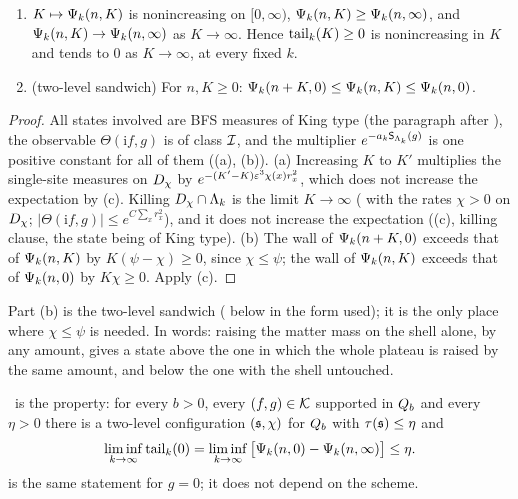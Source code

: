 \begin{lemma}\label{rot:lem:tailprop}
\begin{enumerate}[label=\textup{(\alph*)},leftmargin=*]
\item $K\mapsto\Psi_k(n,K)$ is nonincreasing on $[0,\infty)$, $\Psi_k(n,K)\ge\Psi_k(n,\infty)$, and $\Psi_k(n,K)\to\Psi_k(n,\infty)$ as $K\to\infty$. Hence $\operatorname{tail}_k(K)\ge0$ is nonincreasing in $K$ and tends to $0$ as $K\to\infty$, at every fixed $k$.
\item (two-level sandwich) For $n,K\ge0$: $\Psi_k(n+K,0)\le\Psi_k(n,K)\le\Psi_k(n,0)$.
\end{enumerate}
\end{lemma}

\begin{proof}
All states involved are BFS measures of King type (the paragraph after ), the observable $\Theta(\mathrm if,g)$ is of class $\mathcal I$, and the multiplier $e^{-a_k\mathsf S_{\Lambda_k}(g)}$ is one positive constant for all of them ((a), (b)). (a) Increasing $K$ to $K'$ multiplies the single-site measures on $D_\chi$ by $e^{-(K'-K)\varepsilon^3\chi(x)r_x^2}$, which does not increase the expectation by (c). Killing $D_\chi\cap\Lambda_k$ is the limit $K\to\infty$ ( with the rates $\chi>0$ on $D_\chi$; $|\Theta(\mathrm if,g)|\le e^{C\sum_xr_x^2}$), and it does not increase the expectation ((c), killing clause, the state being of King type). (b) The wall of $\Psi_k(n+K,0)$ exceeds that of $\Psi_k(n,K)$ by $K(\psi-\chi)\ge0$, since $\chi\le\psi$; the wall of $\Psi_k(n,K)$ exceeds that of $\Psi_k(n,0)$ by $K\chi\ge0$. Apply (c).
\end{proof}

Part (b) is the two-level sandwich ( below in the form used); it is the only place where $\chi\le\psi$ is needed. In words: raising the matter mass on the shell alone, by any amount, gives a state above the one in which the whole plateau is raised by the same amount, and below the one with the shell untouched.

\begin{definition}\label{rot:hyp:SH}
\textbf{\SHa}\ is the property: for every $b>0$, every $(f,g)\in\mathcal K$ supported in $Q_{b}$ and every $\eta>0$ there is a two-level configuration $(\mathfrak s,\chi)$ for $Q_{b}$ with $\tau(\mathfrak s)\le\eta$ and
\[
\liminf_{k\to\infty}\operatorname{tail}_k(0)=\liminf_{k\to\infty}\big[\Psi_k(n,0)-\Psi_k(n,\infty)\big]\le\eta .
\]
\textbf{\SHz} is the same statement for $g=0$; it does not depend on the scheme.
\end{definition}

